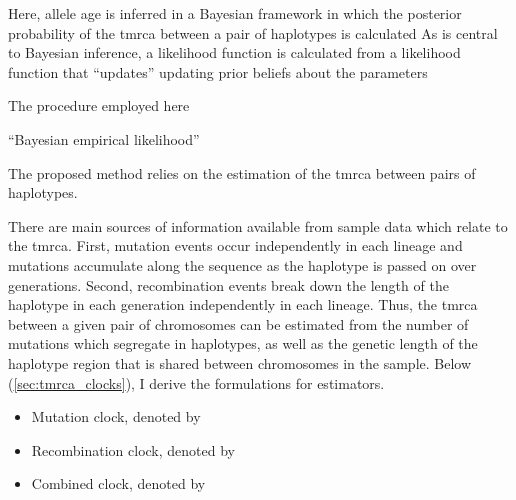 Here, allele age is inferred in a Bayesian framework in which the posterior probability of the \gls{tmrca} between a pair of haplotypes is calculated
As is central to Bayesian inference, a likelihood function
is calculated from a likelihood function that ``updates''
updating prior beliefs about the parameters

The procedure employed here

``Bayesian empirical likelihood''

The proposed method relies on the estimation of the \gls{tmrca} between pairs of haplotypes.


There are  main sources of information available from sample data which relate to the \gls{tmrca}.
First, mutation events occur independently in each lineage and mutations accumulate along the sequence as the haplotype is passed on over generations.
Second, recombination events break down the length of the haplotype in each generation independently in each lineage.
Thus, the \gls{tmrca} between a given pair of chromosomes can be estimated from the number of mutations which segregate in  haplotypes, as well as the genetic length of the haplotype region that is shared between  chromosomes in the sample.
Below (\cref{sec:tmrca_clocks}), I derive the formulations for  estimators.
\begin{itemize}\singlespacing
  \item Mutation clock, denoted by \ClockM
  \item Recombination clock, denoted by \ClockR
	\item Combined clock, denoted by \ClockC
\end{itemize}


